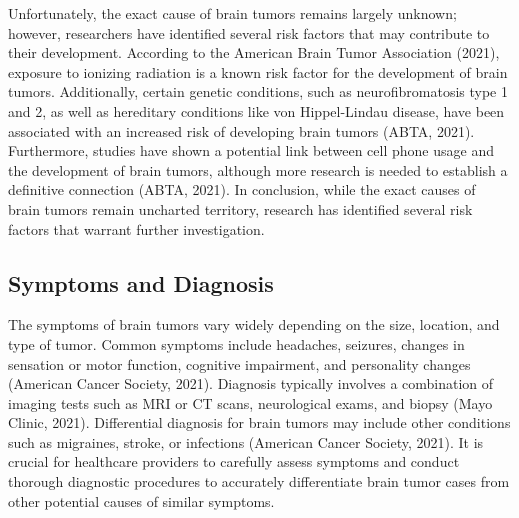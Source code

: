 \documentclass[12pt,oneside]{report}
\begin{document}
\begin{enumerate}
Unfortunately, the exact cause of brain tumors remains largely unknown; however, researchers have identified several risk factors that may contribute to their development. According to the American Brain Tumor Association (2021), exposure to ionizing radiation is a known risk factor for the development of brain tumors. Additionally, certain genetic conditions, such as neurofibromatosis type 1 and 2, as well as hereditary conditions like von Hippel-Lindau disease, have been associated with an increased risk of developing brain tumors (ABTA, 2021). Furthermore, studies have shown a potential link between cell phone usage and the development of brain tumors, although more research is needed to establish a definitive connection (ABTA, 2021). In conclusion, while the exact causes of brain tumors remain uncharted territory, research has identified several risk factors that warrant further investigation.

\end{enumerate}

\subsection{Symptoms and Diagnosis}
The symptoms of brain tumors vary widely depending on the size, location, and type of tumor. Common symptoms include headaches, seizures, changes in sensation or motor function, cognitive impairment, and personality changes (American Cancer Society, 2021). Diagnosis typically involves a combination of imaging tests such as MRI or CT scans, neurological exams, and biopsy (Mayo Clinic, 2021). Differential diagnosis for brain tumors may include other conditions such as migraines, stroke, or infections (American Cancer Society, 2021). It is crucial for healthcare providers to carefully assess symptoms and conduct thorough diagnostic procedures to accurately differentiate brain tumor cases from other potential causes of similar symptoms.
\end{document}
